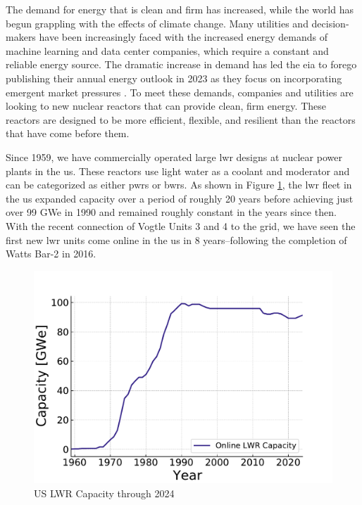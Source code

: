 The demand for energy that is clean and firm has increased, while the world has begun grappling with the effects of climate change. Many utilities and decision-makers have been increasingly faced with the increased energy demands of machine learning and data center companies, which require a constant and reliable energy source. The dramatic increase in demand has led the \gls{eia} to forego publishing their annual energy outlook in 2023 as they focus on incorporating emergent market pressures \cite{eia_annual_outlook_canceled_2023}. To meet these demands, companies and utilities are looking to new nuclear reactors that can provide clean, firm energy. These reactors are designed to be more efficient, flexible, and resilient than the reactors that have come before them.

Since 1959, we have commercially operated large \gls{lwr} designs at nuclear power plants in the \gls{us}. These reactors use light water as a coolant and moderator and can be categorized as either \gls{pwr}s or \gls{bwr}s. As shown in Figure \ref{fig:online_lwr_cap_2024}, the \gls{lwr} fleet in the \gls{us} expanded capacity over a period of roughly 20 years before achieving just over 99 GWe in 1990 and remained roughly constant in the years since then. With the recent connection of Vogtle Units 3 and 4 to the grid, we have seen the first new \gls{lwr} units come online in the \gls{us} in 8 years--following the completion of Watts Bar-2 in 2016.

\begin{figure}[htbp]
    \centering
    \includegraphics[scale=0.8]{images/intro/online_lwr_cap_2024.pdf}
    \caption{US LWR Capacity through 2024 \cite{IAEA_PRIS}}
    \label{fig:online_lwr_cap_2024}
\end{figure}

